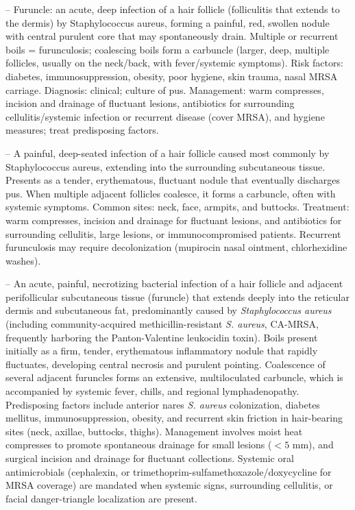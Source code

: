-- Furuncle: an acute, deep infection of a hair follicle (folliculitis that extends to the dermis) by Staphylococcus aureus, forming a painful, red, swollen nodule with central purulent core that may spontaneously drain. Multiple or recurrent boils = furunculosis; coalescing boils form a carbuncle (larger, deep, multiple follicles, usually on the neck/back, with fever/systemic symptoms). Risk factors: diabetes, immunosuppression, obesity, poor hygiene, skin trauma, nasal MRSA carriage. Diagnosis: clinical; culture of pus. Management: warm compresses, incision and drainage of fluctuant lesions, antibiotics for surrounding cellulitis/systemic infection or recurrent disease (cover MRSA), and hygiene measures; treat predisposing factors.

-- A painful, deep-seated infection of a hair follicle caused most commonly by Staphylococcus aureus, extending into the surrounding subcutaneous tissue. Presents as a tender, erythematous, fluctuant nodule that eventually discharges pus. When multiple adjacent follicles coalesce, it forms a carbuncle, often with systemic symptoms. Common sites: neck, face, armpits, and buttocks. Treatment: warm compresses, incision and drainage for fluctuant lesions, and antibiotics for surrounding cellulitis, large lesions, or immunocompromised patients. Recurrent furunculosis may require decolonization (mupirocin nasal ointment, chlorhexidine washes).

-- An acute, painful, necrotizing bacterial infection of a hair follicle and adjacent perifollicular subcutaneous tissue (furuncle) that extends deeply into the reticular dermis and subcutaneous fat, predominantly caused by \textit{Staphylococcus aureus} (including community-acquired methicillin-resistant \textit{S. aureus}, CA-MRSA, frequently harboring the Panton-Valentine leukocidin toxin). Boils present initially as a firm, tender, erythematous inflammatory nodule that rapidly fluctuates, developing central necrosis and purulent pointing. Coalescence of several adjacent furuncles forms an extensive, multiloculated carbuncle, which is accompanied by systemic fever, chills, and regional lymphadenopathy. Predisposing factors include anterior nares \textit{S. aureus} colonization, diabetes mellitus, immunosuppression, obesity, and recurrent skin friction in hair-bearing sites (neck, axillae, buttocks, thighs). Management involves moist heat compresses to promote spontaneous drainage for small lesions ($<5\text{ mm}$), and surgical incision and drainage for fluctuant collections. Systemic oral antimicrobials (cephalexin, or trimethoprim-sulfamethoxazole/doxycycline for MRSA coverage) are mandated when systemic signs, surrounding cellulitis, or facial danger-triangle localization are present.

